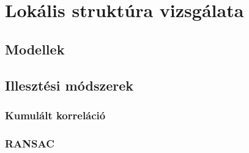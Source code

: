 \chapter{Lokális struktúra vizsgálata}\label{sect:LocalStruct}



\section{Modellek}\label{sect:Models}



\section{Illesztési módszerek}\label{sect:modelMatch}



\subsection{Kumulált korreláció}\label{sect:CumCorr}



\subsection{RANSAC}\label{sect:ransac}
